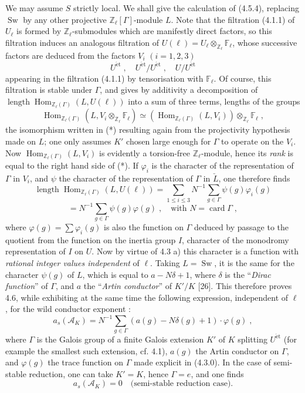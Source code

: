 \documentclass[11pt]{article}
\theoremstyle{plain}
\theoremstyle{definition}
\theoremstyle{remark}
\newcommand{\FF}{\mathbb F}
\newcommand{\ZZ}{\mathbb Z}
\newcommand{\sA}{\mathscr A}\newcommand{\sB}{\mathscr B}\newcommand{\sC}{\mathscr C}
\DeclareMathOperator{\Hom}{Hom}
\DeclareMathOperator{\card}{card}
\newcommand{\et}{\mathrm{\acute{e}t}}
\newcommand{\longueur}{\operatorname{length}}
\begin{document}
We may assume $S$ strictly local. We shall give the calculation of
(4.5.4), replacing $\operatorname{Sw}$ by any other projective
$\ZZ_{\ell}[\Gamma]$-module $L$. Note that the filtration (4.1.1) of
$U_{\ell}$ is formed by $\ZZ_{\ell}$-submodules which are manifestly
direct factors, so this filtration induces an analogous filtration of
$U(\ell) = U_{\ell} \otimes_{\ZZ_{\ell}} \FF_{\ell}$, whose successive
factors are deduced from the factors $V_i$ $(i = 1, 2, 3)$
\[
U^{\et} \; , \quad U^{\et}/U^{\et} \; , \quad U/U^{\et}
\]
appearing in the filtration (4.1.1) by tensorisation with $\FF_{\ell}$.
Of course, this filtration is stable under $\Gamma$, and gives by
additivity a decomposition of
$\longueur \Hom_{\ZZ_{\ell}(\Gamma)}(L, U(\ell))$ into a sum of three
terms, lengths of the groups
\begin{equation}
\Hom_{\ZZ_{\ell}(\Gamma)}(L, V_i \otimes_{\ZZ_{\ell}} \FF_{\ell})
\simeq (\Hom_{\ZZ_{\ell}(\Gamma)}(L, V_i)) \otimes_{\ZZ_{\ell}}
\FF_{\ell} \; ,
\end{equation}
the isomorphism written in (*) resulting again from the projectivity
hypothesis made on $L$; one only assumes $K'$ chosen large enough for
$\Gamma$ to operate on the $V_i$. Now
$\Hom_{\ZZ_{\ell}(\Gamma)}(L, V_i)$ is evidently a torsion-free
$\ZZ_{\ell}$-module, hence its \emph{rank} is equal to the right hand
side of (*). If $\varphi_i$ is the character of the representation of
$\Gamma$ in $V_i$, and $\psi$ the character of the representation of
$\Gamma$ in $\check{L}$, one therefore finds
\begin{equation}
\longueur \Hom_{\ZZ_{\ell}(\Gamma)}(L, U(\ell)) = \sum_{1 \leq i
\leq 3} N^{-1} \sum_{g \in \Gamma} \psi(g) \varphi_i(g)
\end{equation}
\[
= N^{-1} \sum_{g \in \Gamma} \psi(g) \varphi(g) \; , \quad
\text{with } N = \card \Gamma \; ,
\]
where $\varphi(g) = \sum \varphi_i(g)$ is also the function on $\Gamma$
deduced by passage to the quotient from the function on the inertia
group $I$, character of the monodromy representation of $I$ on $U$. Now
by virtue of 4.3 a) this character is a function with \emph{rational
integer values independent} of $\ell$. Taking $L = \operatorname{Sw}$,
it is the same for the character $\psi(g)$ of $L$, which is equal to
$a - N\delta + 1$, where $\delta$ is the ``\emph{Dirac function}'' of
$\Gamma$, and $a$ the ``\emph{Artin conductor}'' of $K'/K$ [26]. This
therefore proves 4.6, while exhibiting at the same time the following
expression, independent of $\ell$, for the wild conductor exponent :
\begin{equation}
a_s(\sA_K) = N^{-1} \sum_{g \in \Gamma} (a(g) - N\delta(g) + 1) \cdot
\varphi(g) \; ,
\end{equation}
where $\Gamma$ is the Galois group of a finite Galois extension $K'$ of
$K$ splitting $U^{\et}$ (for example the smallest such extension, cf.
4.1), $a(g)$ the Artin conductor on $\Gamma$, and $\varphi(g)$ the trace
function on $\Gamma$ made explicit in (4.3.0). In the case of
semi-stable reduction, one can take $K' = K$, hence $\Gamma = e$, and one
finds
\begin{equation}
a_s(\sA_K) = 0 \quad \text{(semi-stable reduction case).}
\end{equation}
\end{document}
